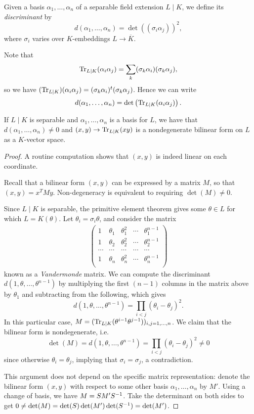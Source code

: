 \begin{defn}
	Given a basis $\alpha_1,\dots,\alpha_n$ of a separable field extension $L\mid K$, we define its \emph{discriminant} by
	\[
		d(\alpha_1,\dots,\alpha_n) = \det((\sigma_i\alpha_j))^2,
	\]
	where $\sigma_i$ varies over $K$-embeddings $L\to\overline{K}$.
\end{defn}

Note that
\[
	\operatorname{Tr}_{L\mid K}(\alpha_i\alpha_j) = \sum_k(\sigma_k\alpha_i)(\sigma_k\alpha_j),
\]
so we have $(\operatorname{Tr}_{L\mid K})(\alpha_i\alpha_j)=(\sigma_k\alpha_i)^t(\sigma_k\alpha_j)$. Hence we can write
\[
	d(\alpha_1,\dots,\alpha_n)=\det\left(\operatorname{Tr}_{L\mid K}(\alpha_i\alpha_j)\right).
\]


\begin{prop}[Neukirch 2.8]
	If $L\mid K$ is separable and $\alpha_1,\dots,\alpha_n$ is a basis for $L$, we have that $d(\alpha_1,\dots,\alpha_n)\neq 0$ and $(x,y) \to \operatorname{Tr}_{L\mid K}(xy)$ is a nondegenerate bilinear form on $L$ as a $K$-vector space.
\end{prop}
\begin{proof}
	A routine computation shows that $(x,y)$ is indeed linear on each coordinate.

	Recall that a bilinear form $(x,y)$ can be expressed by a matrix $M$, so that $(x,y) = x^T M y$. Non-degeneracy is equivalent to requiring $\det(M)\neq 0$.
	
	Since $L\mid K$ is separable, the primitive element theorem gives some $\theta\in L$ for which $L=K(\theta)$. Let $\theta_i=\sigma_i\theta$, and consider the matrix
	\begin{align*}
	\begin{pmatrix}
		1 & \theta_1 & \theta_1^2 & \cdots & \theta_1^{n-1}\\
		1 & \theta_2 & \theta_2^2 & \cdots & \theta_2^{n-1}\\
		\cdots & \cdots &\cdots &\cdots &\cdots\\
		1 & \theta_n & \theta_n^2 & \cdots & \theta_n^{n-1}\\
	\end{pmatrix}
	\end{align*}
	known as a \emph{Vandermonde} matrix. We can compute the discriminant $d(1,\theta,\dots,\theta^{n-1})$ by multiplying the first $(n-1)$ columns in the matrix above by $\theta_1$ and subtracting from the following, which gives
	\[
		d(1,\theta,\dots,\theta^{n-1}) = \prod_{i<j}(\theta_i-\theta_j)^2.
	\]
	In this particular case, $M=(\operatorname{Tr}_{L\mid K}(\theta^{i-1}\theta^{j-1}))_{i,j=1,\dots,n}$. We claim that the bilinear form is nondegenerate, i.e.
	\[
		\det(M) = d(1,\theta,\dots,\theta^{n-1}) = \prod_{i<j}(\theta_i-\theta_j)^2 \neq 0
	\]
	since otherwise $\theta_i = \theta_j$, implying that $\sigma_i=\sigma_j$, a contradiction.

	This argument does not depend on the specific matrix representation: denote the bilinear form $(x,y)$ with respect to some other basis $\alpha_1,\dots,\alpha_n$ by $M'$. Using a change of basis, we have $M=SM'S^{-1}$. Take the determinant on both sides to get $0\neq\det(M)=\det(S)\det(M')\det(S^{-1})=\det(M')$.
\end{proof}



